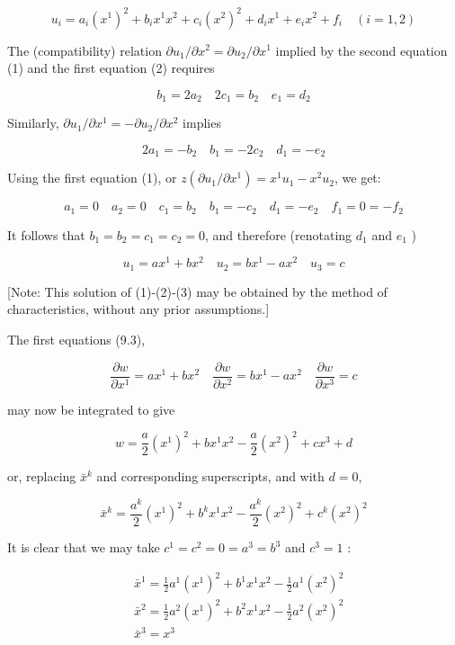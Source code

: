 \documentclass[10pt]{article}
\begin{document}
$$
u_{i}=a_{i}\left(x^{1}\right)^{2}+b_{i} x^{1} x^{2}+c_{i}\left(x^{2}\right)^{2}+d_{i} x^{1}+e_{i} x^{2}+f_{i} \quad(i=1,2)
$$

The (compatibility) relation $\partial u_{1} / \partial x^{2}=\partial u_{2} / \partial x^{1}$ implied by the second equation (1) and the first equation (2) requires

$$
b_{1}=2 a_{2} \quad 2 c_{1}=b_{2} \quad e_{1}=d_{2}
$$

Similarly, $\partial u_{1} / \partial x^{1}=-\partial u_{2} / \partial x^{2}$ implies

$$
2 a_{1}=-b_{2} \quad b_{1}=-2 c_{2} \quad d_{1}=-e_{2}
$$

Using the first equation (1), or $z\left(\partial u_{1} / \partial x^{1}\right)=x^{1} u_{1}-x^{2} u_{2}$, we get:

$$
a_{1}=0 \quad a_{2}=0 \quad c_{1}=b_{2} \quad b_{1}=-c_{2} \quad d_{1}=-e_{2} \quad f_{1}=0=-f_{2}
$$

It follows that $b_{1}=b_{2}=c_{1}=c_{2}=0$, and therefore (renotating $d_{1}$ and $e_{1}$ )

$$
u_{1}=a x^{1}+b x^{2} \quad u_{2}=b x^{1}-a x^{2} \quad u_{3}=c
$$

[Note: This solution of (1)-(2)-(3) may be obtained by the method of characteristics, without any prior assumptions.]

The first equations (9.3),

$$
\frac{\partial w}{\partial x^{1}}=a x^{1}+b x^{2} \quad \frac{\partial w}{\partial x^{2}}=b x^{1}-a x^{2} \quad \frac{\partial w}{\partial x^{3}}=c
$$

may now be integrated to give

$$
w=\frac{a}{2}\left(x^{1}\right)^{2}+b x^{1} x^{2}-\frac{a}{2}\left(x^{2}\right)^{2}+c x^{3}+d
$$

or, replacing $\bar{x}^{k}$ and corresponding superscripts, and with $d=0$,

$$
\bar{x}^{k}=\frac{a^{k}}{2}\left(x^{1}\right)^{2}+b^{k} x^{1} x^{2}-\frac{a^{k}}{2}\left(x^{2}\right)^{2}+c^{k}\left(x^{2}\right)^{2}
$$

It is clear that we may take $c^{1}=c^{2}=0=a^{3}=b^{3}$ and $c^{3}=1$ :

$$
\begin{aligned}
& \bar{x}^{1}=\frac{1}{2} a^{1}\left(x^{1}\right)^{2}+b^{1} x^{1} x^{2}-\frac{1}{2} a^{1}\left(x^{2}\right)^{2} \\
& \bar{x}^{2}=\frac{1}{2} a^{2}\left(x^{1}\right)^{2}+b^{2} x^{1} x^{2}-\frac{1}{2} a^{2}\left(x^{2}\right)^{2} \\
& \bar{x}^{3}=x^{3}
\end{aligned}
$$
\end{document}
